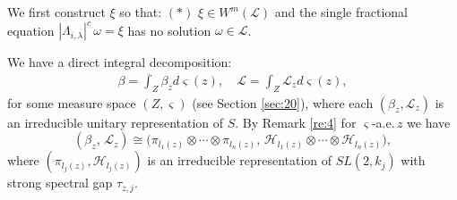 \documentclass[11 pt]{amsart}
\theoremstyle{definition}
\numberwithin{equation}{section}
\begin{document}

 We first construct $\xi$ so that: $(*)$ $\xi\in W^m(\mathcal L)$ and the single fractional equation $|\Lambda_{i,\lambda}|^{c}\,\omega = \xi$
has no solution $\omega\in\mathcal L$.

We have a direct integral decomposition:
\begin{align*}
  \beta=\int_Z \beta_z d\varsigma(z),\quad \mathcal{L}=\int_Z \mathcal{L}_z d\varsigma(z),
\end{align*}
for some measure space $(Z,\varsigma)$ (see Section \ref{sec:20}), where each $(\beta_z,\mathcal{L}_z)$ is an irreducible unitary
representation of $S$. By Remark \ref{re:4}
for $\varsigma$-a.e.\,$z$ we have
\[
 (\beta_z,\, \mathcal{L}_z)
 \cong
 \bigl(\pi_{l_1(z)}\otimes \cdots \otimes \pi_{l_n(z)},\,
       \mathcal{H}_{l_1(z)}\otimes \cdots \otimes \mathcal{H}_{l_n(z)}\bigr),
\]
where $(\pi_{l_j(z)},\mathcal{H}_{l_j(z)})$ is an irreducible
representation of $SL(2,k_j)$ with strong spectral gap $\tau_{z,j}$.

\end{document}
